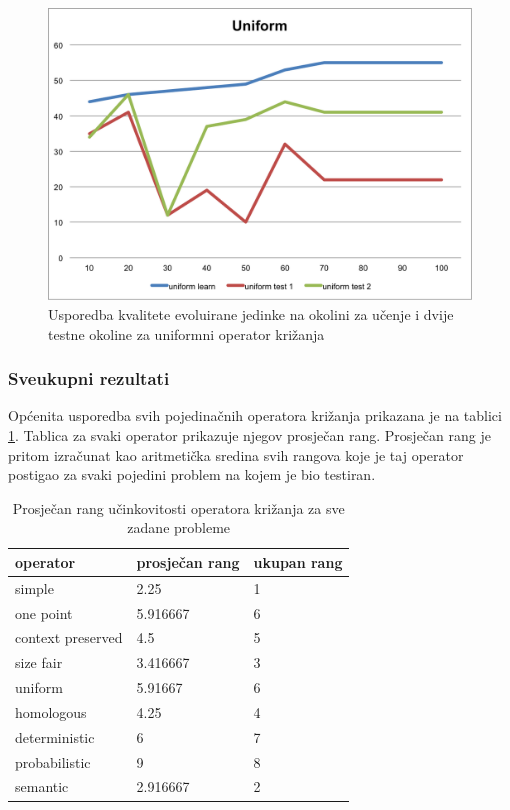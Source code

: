 \begin{figure}[H]
	\centering
	\includegraphics[scale=0.8]{./slike/cross-validation/uniform.png}
	\caption{Usporedba kvalitete evoluirane jedinke na okolini za učenje i dvije testne okoline za uniformni operator križanja}
	\label{uniform}
\end{figure}


\subsubsection{Sveukupni rezultati}
Općenita usporedba svih pojedinačnih operatora križanja prikazana je na tablici \ref{overAllTable}. Tablica za svaki operator prikazuje njegov prosječan rang. Prosječan rang je pritom izračunat kao aritmetička sredina svih rangova koje je taj operator postigao za svaki pojedini problem na kojem je bio testiran.

\begin{table}[H]
 	\centering
 \caption{Prosječan rang učinkovitosti operatora križanja za sve zadane probleme}
 
    \begin{tabular}{| l | l | l |}
    \hline
   \textbf{operator} & \textbf{prosječan rang} & \textbf{ukupan rang} \\ \hline
   simple & 2.25 & 1\\ \hline
   one point & 5.916667 & 6\\ \hline
   context preserved & 4.5 & 5 \\ \hline
   size fair & 3.416667 & 3\\ \hline
   uniform & 5.91667 & 6\\ \hline
   homologous & 4.25 & 4\\ \hline
   deterministic & 6 & 7\\ \hline
   probabilistic & 9 & 8\\ \hline
   semantic & 2.916667 & 2\\ \hline

 
    \end{tabular}
    
   
    \label{overAllTable}
\end{table}


